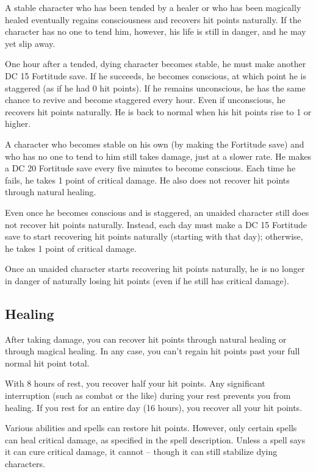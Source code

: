 A stable character who has been tended by a healer or who has been magically healed eventually regains consciousness and recovers hit points naturally. If the character has no one to tend him, however, his life is still in danger, and he may yet slip away.

 One hour after a tended, dying character
becomes stable, he must make another DC 15 Fortitude save. If he succeeds, he becomes conscious, at which point he is staggered (as if he had 0 hit points). If he remains unconscious, he has the same chance to revive and become staggered every hour. Even if unconscious, he recovers hit points naturally. He is back to normal when his hit points rise to 1 or higher.

 A character who becomes stable on his own (by making the Fortitude save) and who has no one to tend to him still takes damage, just at a slower rate. He makes a DC 20 Fortitude save every five minutes to become conscious. Each time he fails, he takes 1 point of critical damage. He also does not recover hit points through natural healing.

Even once he becomes conscious and is staggered, an unaided character still does not recover hit points naturally. Instead, each day must make a DC 15 Fortitude save to start recovering hit points naturally (starting with that day); otherwise, he takes 1 point of critical damage.

Once an unaided character starts recovering hit points naturally, he is no longer in danger of naturally losing hit points (even if he still has critical damage).

\subsection{Healing}
After taking damage, you can recover hit points through natural healing or through magical healing. In any case, you can't regain hit points past your full normal hit point total.

 With 8 hours of rest, you recover half your hit points. Any significant interruption (such as combat or the like) during your rest prevents you from healing. If you rest for an entire day (16 hours), you recover all your hit points.

 Various abilities and spells can restore hit points. However, only certain spells can heal critical damage, as specified in the spell description. Unless a spell says it can cure critical damage, it cannot -- though it can still stabilize dying characters.

